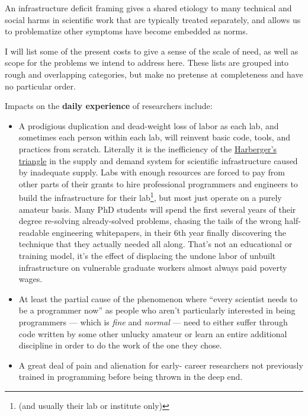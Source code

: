 \documentclass[10pt]{article}
\begin{document}
\begin{multicols}{2}
 An infrastructure deficit framing gives a shared etiology
to many technical and social harms in scientific work that are typically
treated separately, and allows us to problematize other symptoms have
become embedded as norms.

I will list some of the present costs to give a sense of the scale of
need, as well as scope for the problems we intend to address here. These
lists are grouped into rough and overlapping categories, but make no
pretense at completeness and have no particular order.

Impacts on the \textbf{daily experience} of researchers include:

\begin{itemize}

\item
  A prodigious duplication and dead-weight loss of labor as each lab,
  and sometimes each person within each lab, will reinvent basic code,
  tools, and practices from scratch. Literally it is the inefficiency of
  the
  \href{https://en.wikipedia.org/wiki/Deadweight_loss\#Harberger's_triangle}{Harberger's
  triangle} in the supply and demand system for scientific
  infrastructure caused by inadequate supply. Labs with enough resources
  are forced to pay from other parts of their grants to hire
  professional programmers and engineers to build the infrastructure for
  their lab\footnote{(and usually their lab or institute only)}, but
  most just operate on a purely amateur basis. Many PhD students will
  spend the first several years of their degree re-solving
  already-solved problems, chasing the tails of the wrong half-readable
  engineering whitepapers, in their 6th year finally discovering the
  technique that they actually needed all along. That's not an
  educational or training model, it's the effect of displacing the
  undone labor of unbuilt infrastructure on vulnerable graduate workers
  almost always paid poverty wages.
\item
  At least the partial cause of the phenomenon where ``every scientist
  needs to be a programmer now'' as people who aren't particularly
  interested in being programmers --- which is \emph{fine} and
  \emph{normal} --- need to either suffer through code written by some
  other unlucky amateur or learn an entire additional discipline in
  order to do the work of the one they chose.
\item
  A great deal of pain and alienation for early- career researchers not
  previously trained in programming before being thrown in the deep end.

\end{itemize}
\end{multicols}
\end{document}
